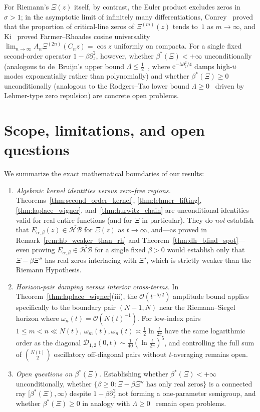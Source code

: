 \documentclass[11pt,reqno]{amsart}
\theoremstyle{definition}
\theoremstyle{remark}
\numberwithin{equation}{section}
\newcommand{\ee}{\mathrm{e}}
\begin{document}
For Riemann's $\Xi(z)$ itself, by contrast, the Euler product excludes zeros in $\sigma > 1$; in the asymptotic limit of infinitely many differentiations, Conrey~\cite{conrey1983} proved that the proportion of critical-line zeros of $\Xi^{(m)}(z)$ tends to~$1$ as $m \to \infty$, and Ki~\cite{ki2006} proved Farmer--Rhoades cosine universality $\lim_{n \to \infty} A_n\Xi^{(2n)}(C_n z) = \cos z$ uniformly on compacta. For a single fixed second-order operator $1 - \beta\partial_z^2$, however, whether $\beta^*(\Xi) < +\infty$ unconditionally (analogous to de~Bruijn's upper bound $\Lambda \le \frac{1}{2}$~\cite{debruijn1950}, where $\ee^{-\lambda\partial_z^2/4}$ damps high-$u$ modes exponentially rather than polynomially) and whether $\beta^*(\Xi) \ge 0$ unconditionally (analogous to the Rodgers--Tao lower bound $\Lambda \ge 0$~\cite{rodgerstao2020} driven by Lehmer-type zero repulsion) are concrete open problems.

\section{Scope, limitations, and open questions}\label{sec:scope}

We summarize the exact mathematical boundaries of our results:
\begin{enumerate}[label=\textup{(\arabic*)},leftmargin=2.2em]
\item \textit{Algebraic kernel identities versus zero-free regions.} Theorems~\ref{thm:second_order_kernel}, \ref{thm:lehmer_lifting}, \ref{thm:laplace_wigner}, and~\ref{thm:hurwitz_chain} are unconditional identities valid for real-entire functions (and for $\Xi$ in particular). They do \emph{not} establish that $E_{\alpha,\beta}(z) \in \overline{\mathcal{HB}}$ for $\Xi(z)$ as $t \to \infty$, and---as proved in Remark~\ref{rem:hb_weaker_than_rh} and Theorem~\ref{thm:dh_blind_spot}---even proving $E_{\alpha,\beta} \in \overline{\mathcal{HB}}$ for a single fixed $\beta > 0$ would establish only that $\Xi - \beta\Xi''$ has real zeros interlacing with $\Xi'$, which is strictly weaker than the Riemann Hypothesis.
\item \textit{Horizon-pair damping versus interior cross-terms.} In Theorem~\ref{thm:laplace_wigner}(iii), the $\mathcal{O}(t^{-5/2})$ amplitude bound applies specifically to the boundary pair $(N-1, N)$ near the Riemann--Siegel horizon where $\omega_n(t) = \mathcal{O}(N(t)^{-1})$. For low-index pairs $1 \le m < n \ll N(t)$, $\omega_m(t), \omega_n(t) \asymp \frac{1}{2}\ln\frac{t}{2\pi}$ have the same logarithmic order as the diagonal $\mathcal{D}_{1,2}(0,t) \sim \frac{1}{40}(\ln\frac{t}{2\pi})^5$, and controlling the full sum of $\binom{N(t)}{2}$ oscillatory off-diagonal pairs without $t$-averaging remains open.
\item \textit{Open questions on $\beta^*(\Xi)$.} Establishing whether $\beta^*(\Xi) < +\infty$ unconditionally, whether $\{ \beta \ge 0 : \Xi - \beta\Xi'' \text{ has only real zeros}\}$ is a connected ray $[\beta^*(\Xi), \infty)$ despite $1 - \beta\partial_z^2$ not forming a one-parameter semigroup, and whether $\beta^*(\Xi) \ge 0$ in analogy with $\Lambda \ge 0$~\cite{rodgerstao2020} remain open problems.
\end{enumerate}
\end{document}
